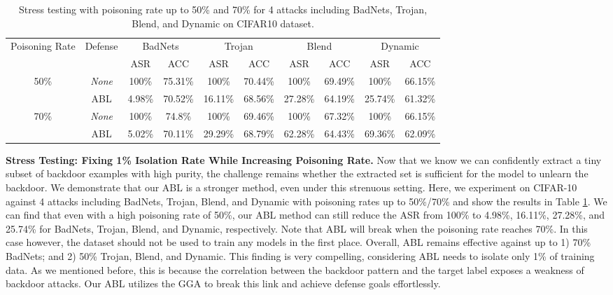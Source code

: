 \begin{table}[!tp]
\renewcommand{\arraystretch}{1.2}
\renewcommand\tabcolsep{1.8pt}
\small
\centering
\caption{Stress testing with poisoning rate up to 50\% and 70\% for 4 attacks including BadNets, Trojan, Blend, and Dynamic on CIFAR10 dataset. }
\label{tab2}
\begin{tabular}{c|c|cccccccc}
\hline
\multirow{2}{*}{Poisoning Rate} & \multirow{2}{*}{Defense} & \multicolumn{2}{c}{BadNets} & \multicolumn{2}{c}{Trojan} & \multicolumn{2}{c}{Blend} & \multicolumn{2}{c}{Dynamic} \\ \cline{3-10} 
 &  & ASR & ACC & ASR & ACC & ASR & ACC & ASR & ACC \\ \hline
\multirow{2}{*}{50\%} & \emph{None} & 100\% & 75.31\% & 100\% & 70.44\% & 100\% & 69.49\% & 100\% & 66.15\% \\ 
 & ABL & 4.98\% & 70.52\% & 16.11\% & 68.56\% & 27.28\% & 64.19\% & 25.74\% & 61.32\% \\ \hline
\multirow{2}{*}{70\%} & \emph{None} & 100\% & 74.8\% & 100\% & 69.46\% & 100\% & 67.32\% & 100\% & 66.15\% \\  
 & ABL & 5.02\% & 70.11\% & 29.29\% & 68.79\% & 62.28\% & 64.43\% & 69.36\% & 62.09\% \\ \hline
\end{tabular}
\vspace{-0.1in}
\end{table}

\noindent\textbf{Stress Testing: Fixing 1\% Isolation Rate While Increasing Poisoning Rate.} \label{sec:stress testing}
Now that we know we can confidently extract a tiny subset of backdoor examples with high purity, the challenge remains whether the extracted set is sufficient for the model to unlearn the backdoor. We demonstrate that our ABL is a stronger method, even under this strenuous setting. Here, we experiment on CIFAR-10 against 4 attacks including BadNets, Trojan, Blend, and Dynamic with poisoning rates up to 50\%/70\% and show the results in Table \ref{tab2}. We can find that even with a high poisoning rate of 50\%, our ABL method can still reduce the ASR from 100\% to 4.98\%, 16.11\%, 27.28\%, and 25.74\% for BadNets, Trojan, Blend, and Dynamic, respectively. Note that ABL will break when the poisoning rate reaches 70\%. In this case however, the dataset should not be used to train any models in the first place. Overall, ABL remains effective against up to 1) 70\% BadNets; and 2) 50\% Trojan, Blend, and Dynamic. This finding is very compelling, considering ABL needs to isolate only 1\% of training data. As we mentioned before, this is because the correlation between the backdoor pattern and the target label exposes a weakness of backdoor attacks. Our ABL utilizes the GGA to break this link and achieve defense goals effortlessly.

